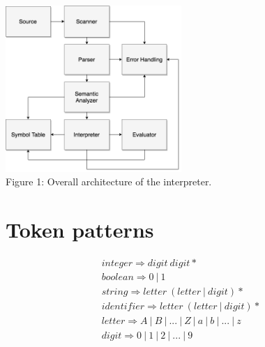 \documentclass[fleqn]{article}
\begin{document}
{\centering
    \vspace*{1cm} 
    \includegraphics[width=0.5\textwidth]{architecture}
    \\Figure 1: Overall architecture of the interpreter.
    \par
}
 
\newpage
\section{Token patterns}

\begin{gather*}
    integer \Rightarrow digit \ digit* \\
    boolean \Rightarrow 0 \ | \ 1 \\
    string \Rightarrow letter \ (letter \ | \ digit)* \\
    identifier \Rightarrow letter \ (letter \ | \ digit)* \\
    letter \Rightarrow  A \ | \ B \ | \ . . . \ | \ Z \ | \ a \ | \ b \ | \ . . . \ | \ z \\
    digit \Rightarrow  0 \ | \ 1 \ | \ 2 \ | \ . . . \ | \ 9
\end{gather*}
\end{document}
